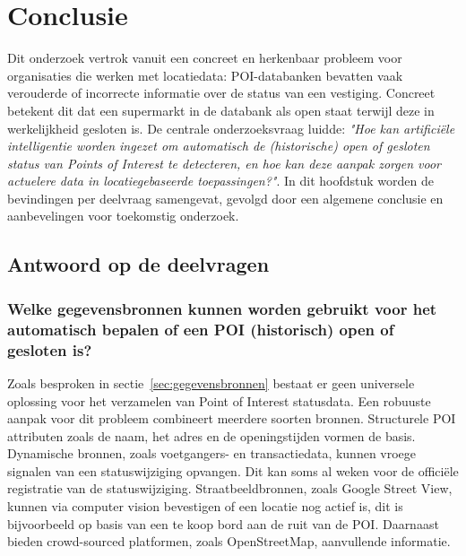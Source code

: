 
\chapter{Conclusie}%
\label{ch:conclusie}


Dit onderzoek vertrok vanuit een concreet en herkenbaar probleem voor organisaties die werken met locatiedata: POI-databanken bevatten vaak verouderde of incorrecte informatie over de status van een vestiging. Concreet betekent dit dat een supermarkt in de databank als open staat terwijl deze in werkelijkheid gesloten is. De centrale onderzoeksvraag luidde: \textit{"Hoe kan artificiële intelligentie worden ingezet om automatisch de (historische) open of gesloten status van Points of Interest te detecteren, en hoe kan deze aanpak zorgen voor actuelere data in locatiegebaseerde toepassingen?"}. In dit hoofdstuk worden de bevindingen per deelvraag samengevat, gevolgd door een algemene conclusie en aanbevelingen voor toekomstig onderzoek.

\section{Antwoord op de deelvragen}

\subsection{Welke gegevensbronnen kunnen worden gebruikt voor het automatisch bepalen of een POI (historisch) open of gesloten is?}
Zoals besproken in sectie~\ref{sec:gegevensbronnen} bestaat er geen universele oplossing voor het verzamelen van Point of Interest statusdata. Een robuuste aanpak voor dit probleem combineert meerdere soorten bronnen. Structurele POI attributen zoals de naam, het adres en de openingstijden vormen de basis. Dynamische bronnen, zoals voetgangers- en transactiedata, kunnen vroege signalen van een statuswijziging opvangen. Dit kan soms al weken voor de officiële registratie van de statuswijziging. Straatbeeldbronnen, zoals Google Street View, kunnen via computer vision bevestigen of een locatie nog actief is, dit is bijvoorbeeld op basis van een te koop bord aan de ruit van de POI. Daarnaast bieden crowd-sourced platformen, zoals OpenStreetMap, aanvullende informatie.

